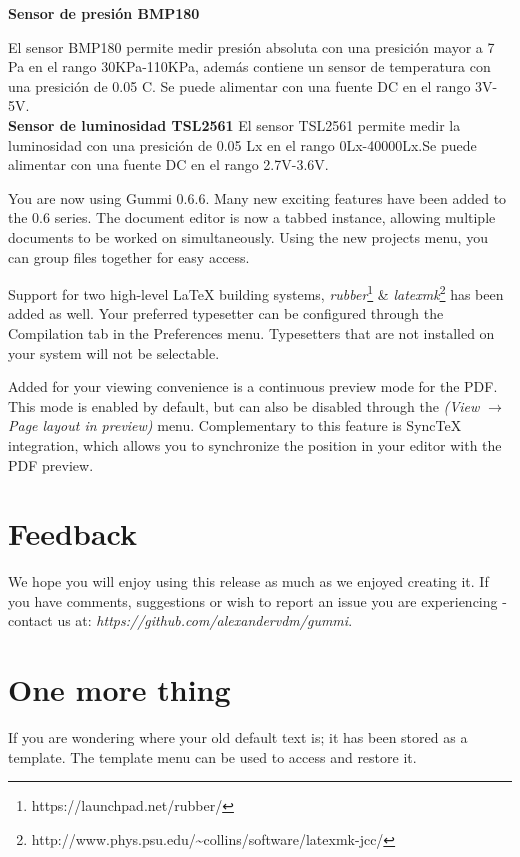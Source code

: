 \documentclass[11pt]{article}
\begin{document}
\noindent \textbf{Sensor de presi\'on BMP180}

\noindent El sensor BMP180 permite medir presi\'on absoluta con una presici\'on mayor a 7 Pa en el rango 30KPa-110KPa, adem\'as contiene un sensor de temperatura con una presici\'on de 0.05 C. Se puede alimentar con una fuente DC en el rango 3V-5V.\\


\noindent \textbf{Sensor de luminosidad TSL2561}
\noindent El sensor TSL2561 permite medir la luminosidad con una presici\'on de 0.05 Lx en el rango 0Lx-40000Lx.Se puede alimentar con una fuente DC en el rango 2.7V-3.6V.

 


You are now using Gummi 0.6.6. Many new exciting features have been added to the 0.6 series. The document editor is now a tabbed instance, allowing multiple documents to be worked on simultaneously. Using the new projects menu, you can group files together for easy access. 

Support for two high-level {\LaTeX} building systems, \emph{rubber}\footnote{https://launchpad.net/rubber/} \& \emph{latexmk}\footnote{http://www.phys.psu.edu/{\textasciitilde}collins/software/latexmk-jcc/} has been added as well. Your preferred typesetter can be configured through the Compilation tab in the Preferences menu. Typesetters that are not installed on your system will not be selectable. 

Added for your viewing convenience is a continuous preview mode for the PDF. This mode is enabled by default, but can also be disabled through the \emph{(View $\rightarrow$ Page layout in preview)} menu. Complementary to this feature is SyncTeX integration, which allows you to synchronize the position in your editor with the PDF preview. 

\section{Feedback}
We hope you will enjoy using this release as much as we enjoyed creating it. If you have comments, suggestions or wish to report an issue you are experiencing - contact us at: \emph{https://github.com/alexandervdm/gummi}.

\section{One more thing}
If you are wondering where your old default text is; it has been stored as a template. The template menu can be used to access and restore it. 
\end{document}
